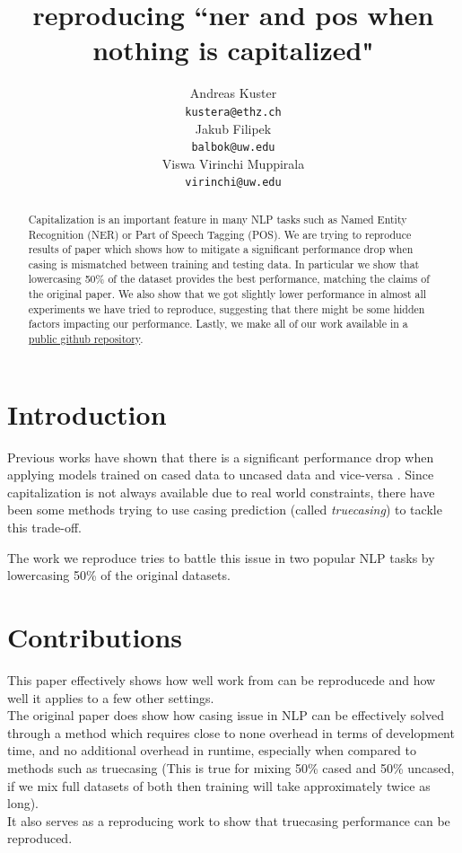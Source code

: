 \documentclass[11pt,a4paper]{article}
\title{reproducing ``ner and pos when nothing is capitalized"}
\author{Andreas Kuster \\
    {\tt kustera@ethz.ch} \\\And
    Jakub Filipek \\
    {\tt balbok@uw.edu} \\\And
    Viswa Virinchi Muppirala \\
    {\tt virinchi@uw.edu}}
\date{}
\begin{document}
\maketitle
\begin{abstract}
    Capitalization is an important feature in many NLP tasks such as Named Entity Recognition (NER) or Part of Speech Tagging (POS). We are trying to reproduce results of paper which shows how to mitigate a significant performance drop when casing is mismatched between training and testing data. In particular we show that lowercasing 50\% of the dataset provides the best performance, matching the claims of the original paper. We also show that we got slightly lower performance in almost all experiments we have tried to reproduce, suggesting that there might be some hidden factors impacting our performance. Lastly, we make all of our work available in a \href{https://github.com/andreaskuster/uw-nlp}{public github repository}.
\end{abstract}

\section{Introduction}
Previous works have shown that there is a significant performance drop when applying models trained on cased data to uncased data and vice-versa \cite{wang-etal-2006-capitalizing}. Since capitalization is not always available due to real world constraints, there have been some methods trying to use casing prediction (called \textit{truecasing}) to tackle this trade-off.

The work we reproduce tries to battle this issue in two popular NLP tasks by lowercasing 50\% of the original datasets.

\section{Contributions}
This paper effectively shows how well work from \cite{ner-and-pos-original} can be reproducede and how well it applies to a few other settings.\\
The original paper does show how casing issue in NLP can be effectively solved through a method which requires close to none overhead in terms of development time, and no additional overhead in runtime, especially when compared to methods such as truecasing (This is true for mixing 50\% cased and 50\% uncased, if we mix full datasets of both then training will take approximately twice as long).\\
It also serves as a reproducing work to show that truecasing performance can be reproduced.
\end{document}
